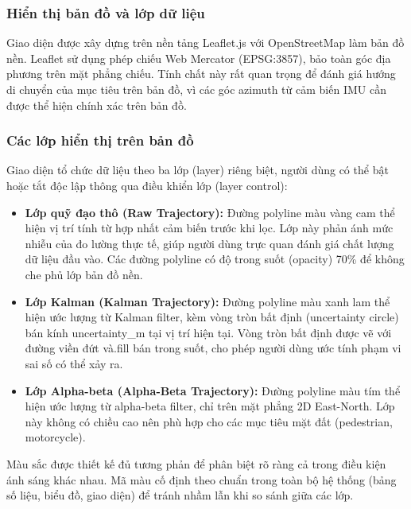 \subsubsection{Hiển thị bản đồ và lớp dữ liệu}

\hspace{0.5cm} Giao diện được xây dựng trên nền tảng Leaflet.js với OpenStreetMap làm bản đồ nền. Leaflet sử dụng phép chiếu Web Mercator (EPSG:3857), bảo toàn góc địa phương trên mặt phẳng chiếu. Tính chất này rất quan trọng để đánh giá hướng di chuyển của mục tiêu trên bản đồ, vì các góc azimuth từ cảm biến IMU cần được thể hiện chính xác trên bản đồ.

\subsubsection{Các lớp hiển thị trên bản đồ}

\hspace{0.5cm} Giao diện tổ chức dữ liệu theo ba lớp (layer) riêng biệt, người dùng có thể bật hoặc tắt độc lập thông qua điều khiển lớp (layer control):

\begin{itemize}
    \item \textbf{Lớp quỹ đạo thô (Raw Trajectory):} Đường polyline màu vàng cam thể hiện vị trí tính từ hợp nhất cảm biến trước khi lọc. Lớp này phản ánh mức nhiễu của đo lường thực tế, giúp người dùng trực quan đánh giá chất lượng dữ liệu đầu vào. Các đường polyline có độ trong suốt (opacity) 70\% để không che phủ lớp bản đồ nền.

    \item \textbf{Lớp Kalman (Kalman Trajectory):} Đường polyline màu xanh lam thể hiện ước lượng từ Kalman filter, kèm vòng tròn bất định (uncertainty circle) bán kính uncertainty\_m tại vị trí hiện tại. Vòng tròn bất định được vẽ với đường viền đứt và.fill bán trong suốt, cho phép người dùng ước tính phạm vi sai số có thể xảy ra.

    \item \textbf{Lớp Alpha-beta (Alpha-Beta Trajectory):} Đường polyline màu tím thể hiện ước lượng từ alpha-beta filter, chỉ trên mặt phẳng 2D East-North. Lớp này không có chiều cao nên phù hợp cho các mục tiêu mặt đất (pedestrian, motorcycle).
\end{itemize}

Màu sắc được thiết kế đủ tương phản để phân biệt rõ ràng cả trong điều kiện ánh sáng khác nhau. Mã màu cố định theo chuẩn trong toàn bộ hệ thống (bảng số liệu, biểu đồ, giao diện) để tránh nhầm lẫn khi so sánh giữa các lớp.

